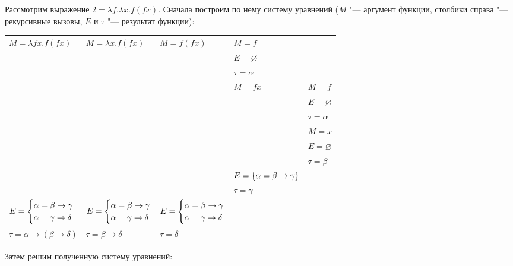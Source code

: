 \begin{example}
    Рассмотрим выражение $\overline 2 = \lambda f . \lambda x . f (f x)$. Сначала построим по нему систему уравнений
    ($M$ "--- аргумент функции, столбики справа "--- рекурсивные вызовы, $E$ и $\tau$ "--- результат функции):
    \begin{center}
        \begin{tabular}{l l l l l} \toprule
            $M = \lambda f x . f (f x)$ & $M = \lambda x . f (f x)$ & $M = f (f x)$ & $M = f$ & \\
            & & & $E = \varnothing$ & \\
            & & & $\tau = \alpha$ \\ \cmidrule{4-5}
            & & & $M = f x$ & $M = f$ \\
            & & & & $E = \varnothing$ \\
            & & & & $\tau = \alpha$ \\ \cmidrule{5-5}
            & & & & $M = x$ \\
            & & & & $E = \varnothing$ \\
            & & & & $\tau = \beta$ \\ \cmidrule{5-5}
            & & & $E = \left\{\alpha = \beta \to \gamma\right\}$ & \\
            & & & $\tau = \gamma$ & \\ \cmidrule{4-5}
            $E = \begin{cases}
              \alpha=\beta\to\gamma \\
              \alpha=\gamma\to\delta
            \end{cases}\mkern-18mu$ &
            $E = \begin{cases}
                \alpha=\beta\to\gamma \\
                \alpha=\gamma\to\delta
            \end{cases}\mkern-18mu$ &
            $E = \begin{cases}
                \alpha=\beta\to\gamma \\
                \alpha=\gamma\to\delta
            \end{cases}\mkern-18mu$ & & \\[1.2em]
            $\tau = \alpha\to(\beta\to\delta)$ &
            $\tau = \beta\to\delta$ &
            $\tau = \delta$ & & \\ \bottomrule
        \end{tabular}
    \end{center}
    Затем решим полученную систему уравнений:

\end{example}
